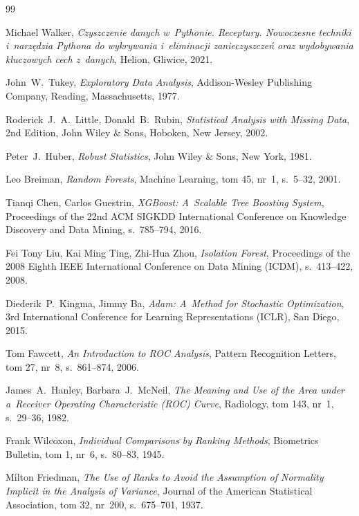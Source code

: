 \def\bibname{\centerline{{\LARGE{LITERATURA}}}}

\begin{thebibliography}{99}

Michael Walker, {\it Czyszczenie danych w~Pythonie. Receptury. Nowoczesne techniki i~narzędzia Pythona do wykrywania i~eliminacji zanieczyszczeń oraz wydobywania kluczowych cech z~danych}, Helion, Gliwice, 2021.

John~W.~Tukey, {\it Exploratory Data Analysis}, Addison-Wesley Publishing Company, Reading, Massachusetts, 1977.

Roderick~J.~A.~Little, Donald~B.~Rubin, {\it Statistical Analysis with Missing Data}, 2nd Edition, John Wiley \& Sons, Hoboken, New Jersey, 2002.

Peter~J.~Huber, {\it Robust Statistics}, John Wiley \& Sons, New York, 1981.

Leo Breiman, {\it Random Forests}, Machine Learning, tom 45, nr~1, s.~5--32, 2001.

Tianqi Chen, Carlos Guestrin, {\it XGBoost: A~Scalable Tree Boosting System}, Proceedings of the 22nd ACM SIGKDD International Conference on Knowledge Discovery and Data Mining, s.~785--794, 2016.

Fei Tony Liu, Kai Ming Ting, Zhi-Hua Zhou, {\it Isolation Forest}, Proceedings of the 2008 Eighth IEEE International Conference on Data Mining (ICDM), s.~413--422, 2008.

Diederik~P.~Kingma, Jimmy Ba, {\it Adam: A~Method for Stochastic Optimization}, 3rd International Conference for Learning Representations (ICLR), San Diego, 2015.

Tom Fawcett, {\it An Introduction to ROC Analysis}, Pattern Recognition Letters, tom 27, nr~8, s.~861--874, 2006.

James~A.~Hanley, Barbara~J.~McNeil, {\it The Meaning and Use of the Area under a~Receiver Operating Characteristic (ROC) Curve}, Radiology, tom 143, nr~1, s.~29--36, 1982.

Frank Wilcoxon, {\it Individual Comparisons by Ranking Methods}, Biometrics Bulletin, tom 1, nr~6, s.~80--83, 1945.

Milton Friedman, {\it The Use of Ranks to Avoid the Assumption of Normality Implicit in the Analysis of Variance}, Journal of the American Statistical Association, tom 32, nr~200, s.~675--701, 1937.


\end{thebibliography}

